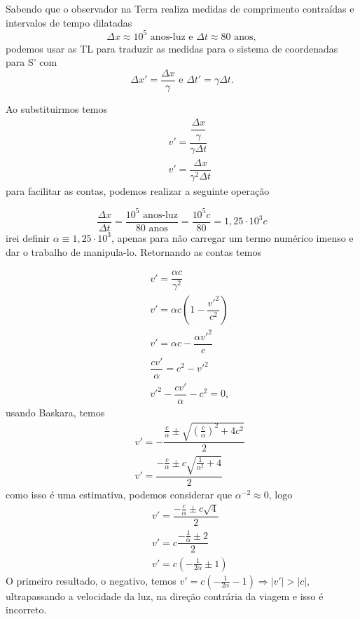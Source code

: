 \documentclass[10pt,a4paper]{article}
\begin{document}
	Sabendo que o observador na Terra realiza medidas de comprimento contraídas e intervalos de tempo dilatadas
	\begin{equation}
		\Delta x \approx 10^5 \text{  anos-luz    e  } \Delta t \approx \text{80 anos},
	\end{equation}
	podemos usar as TL para traduzir as medidas para o sistema de coordenadas para S' com
	\begin{equation}\label{TL_repouso}
		\Delta x' = \dfrac{\Delta x}{\gamma}\text{  e  } \Delta t' = \gamma\Delta t.
	\end{equation}

	Ao substituirmos temos
	\begin{eqnarray}
		&& v' = \dfrac{\dfrac{\Delta x}{\gamma}}{\gamma\Delta t} \nonumber \\
		&& v' = \dfrac{\Delta x}{\gamma^2\Delta t}\nonumber
	\end{eqnarray}
	para facilitar as contas, podemos realizar a seguinte operação
	
	\begin{equation}\nonumber
		\dfrac{\Delta x}{\Delta t } = \dfrac{10^5 \text{  anos-luz}}{80\text{ anos}} = \dfrac{10^5c}{80} = 1,25\cdot10^3c
	\end{equation}
	irei definir $ \alpha\equiv 1,25\cdot10^3 $, apenas para não carregar um termo numérico imenso e dar o trabalho de manipula-lo. Retornando as contas temos
	
	\begin{eqnarray}
	    && v' = \dfrac{\alpha c}{\gamma^2}\nonumber \\
		&& v' = \alpha c \left( 1 - \dfrac{v'^2}{c^2}\right) \nonumber \\
		&& v'  =  \alpha c - \dfrac{ \alpha v'^2}{c} \nonumber \\		
		&& \dfrac{ c v'}{\alpha} = c^2 - v'^2 \nonumber \\
		&& v'^2 - \dfrac{ c v'}{\alpha} - c^2 = 0, \nonumber
	\end{eqnarray}
	usando Baskara, temos
	\begin{eqnarray}
		&& v' = -\dfrac{\frac{c}{\alpha} \pm \sqrt{\left(\frac{c}{\alpha}\right)^2 +4c^2}}{2} \nonumber \\
		&& v' = \dfrac{-\frac{c}{\alpha} \pm c\sqrt{\frac{1}{\alpha^2} +4}}{2} \nonumber 
	\end{eqnarray}
	como isso é uma estimativa, podemos considerar que $ \alpha^{-2} \approx 0 $, logo
	\begin{eqnarray}
		&& v' = \dfrac{-\frac{c}{\alpha} \pm c\sqrt{4}}{2} \nonumber \\
		&& v' = c\dfrac{-\frac{1}{\alpha} \pm 2}{2} \nonumber\\
		&& v' = c\left(-\frac{1}{2\alpha} \pm 1\right) \nonumber 
	\end{eqnarray}
	O primeiro resultado, o negativo, temos
	$ v' = c\left(-\frac{1}{2\alpha} - 1\right) \Longrightarrow |v'| > |c|$, ultrapassando a velocidade da luz, na direção contrária da viagem e isso é incorreto.
	
\end{document}
